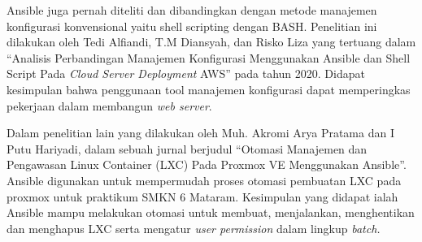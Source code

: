 \documentclass[10pt,]{report}
\begin{document}
\begin{adjustwidth}{0.70cm}{}
	Ansible juga pernah diteliti dan dibandingkan dengan metode manajemen
	konfigurasi konvensional yaitu shell scripting dengan BASH. Penelitian ini
	dilakukan oleh Tedi Alfiandi, T.M Diansyah, dan Risko Liza yang tertuang
	dalam “Analisis Perbandingan Manajemen Konfigurasi Menggunakan Ansible dan
	Shell Script Pada \textit{Cloud Server Deployment} AWS” pada tahun 2020. Didapat
	kesimpulan bahwa penggunaan tool manajemen konfigurasi dapat memperingkas
	pekerjaan dalam membangun \textit{web server}.

	Dalam penelitian lain yang dilakukan oleh Muh. Akromi Arya Pratama dan I Putu
	Hariyadi, dalam sebuah jurnal berjudul “Otomasi Manajemen dan Pengawasan
	Linux Container (LXC) Pada Proxmox VE Menggunakan Ansible”. Ansible digunakan
	untuk mempermudah proses otomasi pembuatan LXC pada proxmox untuk praktikum
	SMKN 6 Mataram. Kesimpulan yang didapat ialah Ansible mampu melakukan otomasi
	untuk membuat, menjalankan, menghentikan dan menghapus LXC serta mengatur
	\textit{user permission} dalam lingkup \textit{batch.}\\
\end{adjustwidth}

\vspace{3cm}
\end{document}
